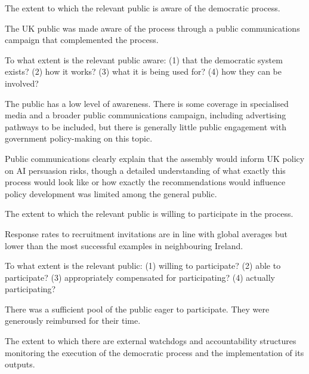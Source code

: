     
    \begin{describe}[grey]
        The extent to which the relevant public is aware of the democratic process.
    \end{describe}

    The UK public was made aware of the process through a public communications campaign that complemented the process.
    
    \begin{evaluate}[grey]
        To what extent is the relevant public aware: (1) that the democratic system exists? (2) how it works? (3) what it is being used for? (4) how they can be involved?
    \end{evaluate}

    The public has a low level of awareness. There is some coverage in specialised media and a broader public communications campaign, including advertising pathways to be included, but there is generally little public engagement with government policy-making on this topic.

    Public communications clearly explain that the assembly would inform UK policy on AI persuasion risks, though a detailed understanding of what exactly this process would look like or how exactly the recommendations would influence policy development was limited among the general public.

    
    \begin{describe}[grey]
        The extent to which the relevant public is willing to participate in the process.
    \end{describe}

    Response rates to recruitment invitations are in line with global averages but lower than the most successful examples in neighbouring Ireland.
    
    \begin{evaluate}[grey]
        To what extent is the relevant public: (1) willing to participate? (2) able to participate? (3) appropriately compensated for participating? (4) actually participating?
    \end{evaluate}

    There was a sufficient pool of the public eager to participate. They were generously reimbursed for their time.
    
    
    \begin{describe}[grey]
        The extent to which there are external watchdogs and accountability structures monitoring the execution of the democratic process and the implementation of its outputs.
    \end{describe}

